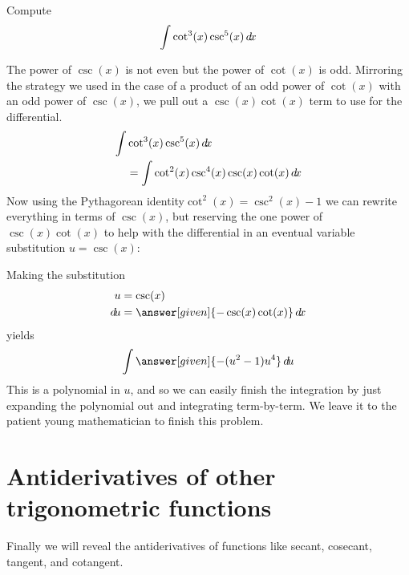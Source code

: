 \documentclass{ximera}
\begin{document}
\begin{example}
  Compute
  \[
  \int \cot^3(x) \csc^5(x) \mathop{}\!d\! x
  \]
  \begin{explanation}
     The power of $\csc(x)$ is not even but the power of $\cot(x)$ is odd. Mirroring the strategy we used in the 
case of a product of an odd power of $\cot(x)$ with an odd power of $\csc(x)$, we pull out a 
   $\csc(x)\cot(x)$ term to use for the differential. 
    \begin{align*}
      \int &\cot^3(x) \csc^5(x) \mathop{}\!d\! x \\
    &= \int\cot^2(x) \csc^4(x) \csc(x)\cot(x) \mathop{}\!d\! x
    \end{align*}
    Now using the Pythagorean identity$ \cot^{2}(x)=\csc^{2}(x)-1$ we can rewrite everything in
    terms of $\csc(x)$, but reserving the one power of $\csc(x)\cot(x)$ to help
    with the differential in an eventual variable substitution $u=\csc(x)$:
    \begin{center}%
    \end{center}
    Making the substitution
    \begin{align*}
      u &= \csc(x)\\
      \d u &=\answer[given]{-\csc(x)\cot(x)} \d x
    \end{align*}
    yields
    \[
    \int \answer[given]{-(u^2-1)u^4} \d u
    \]
    This is a polynomial in $u$, and so we can easily finish the
    integration by just expanding the polynomial out and integrating
    term-by-term. We leave it to the patient young mathematician to
    finish this problem.
  \end{explanation}
\end{example}







\section{Antiderivatives of other trigonometric functions}

Finally we will reveal the antiderivatives of functions like secant,
cosecant, tangent, and cotangent.
\end{document}
